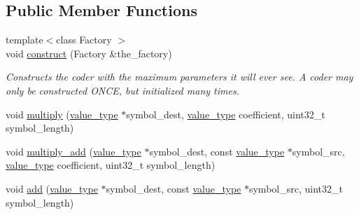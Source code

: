 \subsection*{Public Member Functions}
\begin{DoxyCompactItemize}
\item 
{\footnotesize template$<$class Factory $>$ }\\void \hyperlink{classkodo_1_1finite__field__math_a19453df81e4a8e53325bd10305062bc1}{construct} (Factory \&the\-\_\-factory)
\begin{DoxyCompactList}\small\item\em Constructs the coder with the maximum parameters it will ever see. A coder may only be constructed O\-N\-C\-E, but initialized many times. \end{DoxyCompactList}\item 
void \hyperlink{classkodo_1_1finite__field__math_a9ea80601e001ed2acb44e4b4f7a70339}{multiply} (\hyperlink{classkodo_1_1finite__field__math_a6539f35f436d64698ed6dd7d40ae3ab8}{value\-\_\-type} $\ast$symbol\-\_\-dest, \hyperlink{classkodo_1_1finite__field__math_a6539f35f436d64698ed6dd7d40ae3ab8}{value\-\_\-type} coefficient, uint32\-\_\-t symbol\-\_\-length)
\begin{DoxyCompactList}\small\item\em \end{DoxyCompactList}\item 
void \hyperlink{classkodo_1_1finite__field__math_a319c2d2116e19ba1144fdf8ab2ff7549}{multiply\-\_\-add} (\hyperlink{classkodo_1_1finite__field__math_a6539f35f436d64698ed6dd7d40ae3ab8}{value\-\_\-type} $\ast$symbol\-\_\-dest, const \hyperlink{classkodo_1_1finite__field__math_a6539f35f436d64698ed6dd7d40ae3ab8}{value\-\_\-type} $\ast$symbol\-\_\-src, \hyperlink{classkodo_1_1finite__field__math_a6539f35f436d64698ed6dd7d40ae3ab8}{value\-\_\-type} coefficient, uint32\-\_\-t symbol\-\_\-length)
\begin{DoxyCompactList}\small\item\em \end{DoxyCompactList}\item 
void \hyperlink{classkodo_1_1finite__field__math_a4b975e644dfe8e3c009415ed53d1e39a}{add} (\hyperlink{classkodo_1_1finite__field__math_a6539f35f436d64698ed6dd7d40ae3ab8}{value\-\_\-type} $\ast$symbol\-\_\-dest, const \hyperlink{classkodo_1_1finite__field__math_a6539f35f436d64698ed6dd7d40ae3ab8}{value\-\_\-type} $\ast$symbol\-\_\-src, uint32\-\_\-t symbol\-\_\-length)
\begin{DoxyCompactList}\small\item\em \end{DoxyCompactList}\item 

\end{DoxyCompactItemize}
